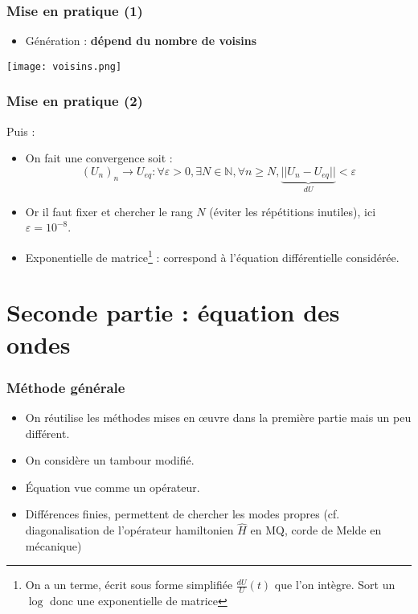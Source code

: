 \documentclass[11pt]{beamer}
\begin{document}
	\begin{frame}
		\frametitle{Mise en pratique (1)}
		\begin{itemize}
			\item Génération : \textbf{dépend du nombre de voisins} 
		\end{itemize}
		\begin{center}
			\texttt{[image: voisins.png]}
		\end{center}
	\end{frame}
	\begin{frame}
		\frametitle{Mise en pratique (2)}
		Puis :
		\begin{itemize}
			\item On fait une convergence soit :
			\[(U_n)_n\to U_{eq} : \forall\varepsilon>0, \exists N\in\mathbb{N}, \forall n\geq N, \underset{dU}{\underbrace{||U_n-U_{eq}||}}<\varepsilon\]
			\item Or il faut fixer et chercher le rang $N$ (éviter les répétitions inutiles), ici $\varepsilon=10^{-8}$.
			\item Exponentielle de matrice\footnote{On a un terme, écrit sous forme simplifiée $\frac{dU}{U}(t)$ que l'on intègre. Sort un $\log$ donc une exponentielle de matrice} : correspond à l'équation différentielle considérée.
		\end{itemize}
\end{frame}

	\section{Seconde partie : équation des ondes}

	\begin{frame}
		\tableofcontents[currentsection]
	\end{frame}

	\begin{frame}
		\frametitle{Méthode générale}
		\begin{itemize}
			\item On réutilise les méthodes mises en \oe uvre dans la première partie mais un peu différent.
			\item On considère un tambour modifié. 
			\item Équation vue comme un opérateur.
			\item Différences finies, permettent de chercher les modes propres (cf. diagonalisation de l'opérateur hamiltonien $\hat{H}$ en MQ, corde de Melde en mécanique)
		\end{itemize}	
	\end{frame}
\end{document}
